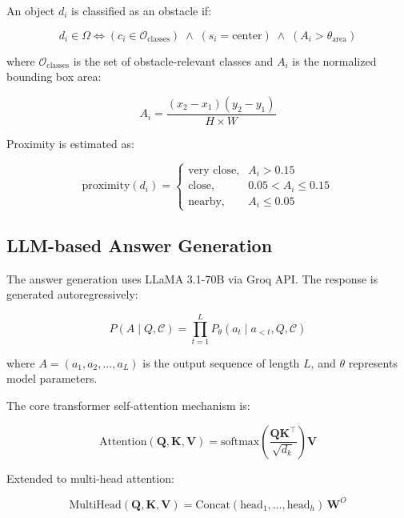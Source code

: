 An object $d_i$ is classified as an obstacle if:

\begin{equation}
d_i \in \Omega \iff (c_i \in \mathcal{O}_{\text{classes}}) \;\wedge\; (s_i = \text{center}) \;\wedge\; (A_i > \theta_{\text{area}})
\end{equation}

where $\mathcal{O}_{\text{classes}}$ is the set of obstacle-relevant classes and $A_i$ is the normalized bounding box area:

\begin{equation}
A_i = \frac{(x_2 - x_1)(y_2 - y_1)}{H \times W}
\end{equation}

Proximity is estimated as:

\begin{equation}
\text{proximity}(d_i) = 
\begin{cases}
    \text{very close}, & A_i > 0.15 \\
    \text{close},      & 0.05 < A_i \leq 0.15 \\
    \text{nearby},     & A_i \leq 0.05
\end{cases}
\end{equation}

\subsection{LLM-based Answer Generation}

The answer generation uses LLaMA 3.1-70B via Groq API. The response is generated autoregressively:

\begin{equation}
P(A \mid Q, \mathcal{C}) = \prod_{t=1}^{L} P_\theta(a_t \mid a_{<t}, Q, \mathcal{C})
\end{equation}

where $A = (a_1, a_2, \ldots, a_L)$ is the output sequence of length $L$, and $\theta$ represents model parameters.

The core transformer self-attention mechanism is:

\begin{equation}
\text{Attention}(\mathbf{Q}, \mathbf{K}, \mathbf{V}) = \text{softmax}\left(\frac{\mathbf{Q}\mathbf{K}^\top}{\sqrt{d_k}}\right) \mathbf{V}
\end{equation}

Extended to multi-head attention:

\begin{equation}
\text{MultiHead}(\mathbf{Q}, \mathbf{K}, \mathbf{V}) = \text{Concat}(\text{head}_1, \ldots, \text{head}_h)\, \mathbf{W}^O
\end{equation}

